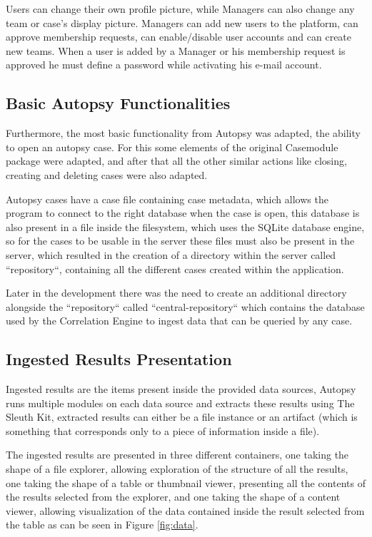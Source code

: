Users can change their own profile picture, while Managers can also change any team or case's display picture.
Managers can add new users to the platform, can approve membership requests, can enable/disable user accounts and can create new teams.
When a user is added by a Manager or his membership request is approved he must define a password while activating his e-mail account.

\subsection{Basic Autopsy Functionalities}

Furthermore, the most basic functionality from Autopsy was adapted, the ability to open an autopsy case. For this some elements of the original Casemodule package were adapted,
and after that all the other similar actions like closing, creating and deleting cases were also adapted.

Autopsy cases have a case file containing case metadata, which allows the program to connect to the right database when the case is open, this database is also present
in a file inside the filesystem, which uses the SQLite database engine, so for the cases to be usable in the server these files must also be present in the server,
which resulted in the creation of a directory within the server called ``repository``, containing all the different cases created within the application.

Later in the development there was the need to create an additional directory alongside the ``repository`` called ``central-repository``
which contains the database used by the Correlation Engine to ingest data that can be queried by any case.

\subsection{Ingested Results Presentation}

Ingested results are the items present inside the provided data sources, Autopsy runs multiple modules on each data source and extracts these results using The Sleuth Kit,
extracted results can either be a file instance or an artifact (which is something that corresponds only to a piece of information inside a file).

The ingested results are presented in three different containers, one taking the shape of a file explorer, allowing exploration of the structure of all the results, 
one taking the shape of a table or thumbnail viewer, presenting all the contents of the results selected from the explorer, and one taking the shape of a content viewer, allowing visualization
of the data contained inside the result selected from the table as can be seen in Figure \ref{fig:data}.

